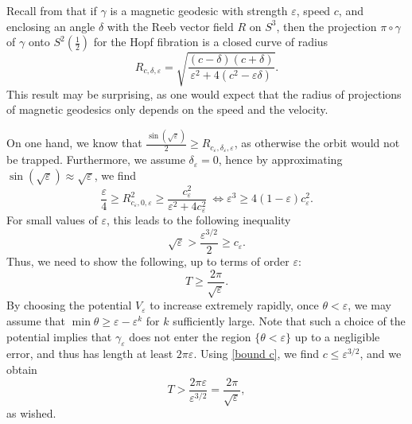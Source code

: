 \documentclass[12pt]{article}
\def\gc{{\gamma}}
\begin{document}
\vspace{4px}

Recall from \cite[Rmk. 1.13]{ABM} that if $\gc$ is a magnetic geodesic with strength $\varepsilon$, speed $c$, and enclosing an angle $\delta$ with the Reeb vector field $R$ on $S^3$, then the projection $\pi \circ \gc$ of $\gc$ onto $S^2\left( \frac{1}{2}\right)$ for the Hopf fibration is a closed curve of radius
\[
R_{c, \delta, \varepsilon} = \sqrt{\frac{(c-\delta)(c+\delta)}{\varepsilon^2 + 4(c^2 - \varepsilon \delta)}}.
\]
This result may be surprising, as one would expect that the radius of projections of magnetic geodesics only depends on the speed and the velocity.

\vspace{4px}

On one hand, we know that $\frac{\sin(\sqrt{\varepsilon})}{2} \geq R_{c_\varepsilon, \delta_\varepsilon, \varepsilon}$, as otherwise the orbit would not be trapped. Furthermore, we assume $\delta_\varepsilon = 0$, hence by approximating $\sin(\sqrt{\varepsilon}) \approx \sqrt{\varepsilon}$, we find
$$
\frac{\varepsilon}{4} \geq R_{c_\varepsilon, 0, \varepsilon}^2 \geq \frac{c_\varepsilon^2}{\varepsilon^2 + 4 c_\varepsilon^2} \ \Leftrightarrow \varepsilon^3 \geq 4(1-\varepsilon)c_\varepsilon^2.
$$
For small values of $\varepsilon$, this leads to the following inequality
\begin{equation}\label{bound c}
\sqrt{\varepsilon} > \frac{\varepsilon^{3/2}}{2} \geq c_\varepsilon.
\end{equation}
\noindent
Thus, we need to show the following, up to terms of order $\varepsilon$:
$$
T \geq \frac{2\pi}{\sqrt{\varepsilon}}.
$$
By choosing the potential $V_\varepsilon$ to increase extremely rapidly, once $\theta < \varepsilon$, we may assume that $\min \theta \geq \varepsilon - \varepsilon^k$ for $k$ sufficiently large. Note that such a choice of the potential implies that $\gamma_\varepsilon$ does not enter the region $\lbrace \theta < \varepsilon \rbrace$ up to a negligible error, and thus has length at least $2\pi \varepsilon$. Using \eqref{bound c}, we find $c \leq \varepsilon^{3/2}$, and we obtain
$$
T > \frac{2\pi \varepsilon}{\varepsilon^{3/2}} = \frac{2\pi}{\sqrt{\varepsilon}},
$$
as wished.
\end{document}
